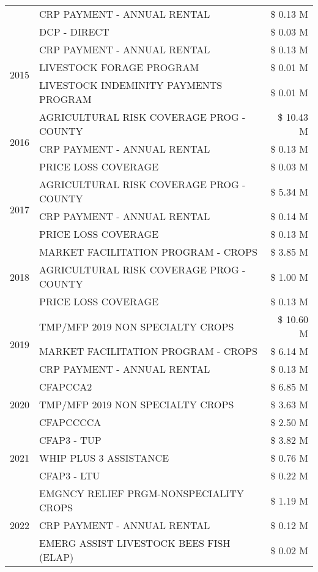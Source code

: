 \begin{tabular}{llr}
 & CRP PAYMENT - ANNUAL RENTAL & \$ 0.13 M \\
 & DCP - DIRECT & \$ 0.03 M \\
\cline{1-3}
\multirow[t]{3}{*}{2015} & CRP PAYMENT - ANNUAL RENTAL & \$ 0.13 M \\
 & LIVESTOCK FORAGE PROGRAM & \$ 0.01 M \\
 & LIVESTOCK INDEMINITY PAYMENTS PROGRAM & \$ 0.01 M \\
\cline{1-3}
\multirow[t]{3}{*}{2016} & AGRICULTURAL RISK COVERAGE PROG - COUNTY & \$ 10.43 M \\
 & CRP PAYMENT - ANNUAL RENTAL & \$ 0.13 M \\
 & PRICE LOSS COVERAGE & \$ 0.03 M \\
\cline{1-3}
\multirow[t]{3}{*}{2017} & AGRICULTURAL RISK COVERAGE PROG - COUNTY & \$ 5.34 M \\
 & CRP PAYMENT - ANNUAL RENTAL & \$ 0.14 M \\
 & PRICE LOSS COVERAGE & \$ 0.13 M \\
\cline{1-3}
\multirow[t]{3}{*}{2018} & MARKET FACILITATION PROGRAM - CROPS & \$ 3.85 M \\
 & AGRICULTURAL RISK COVERAGE PROG - COUNTY & \$ 1.00 M \\
 & PRICE LOSS COVERAGE & \$ 0.13 M \\
\cline{1-3}
\multirow[t]{3}{*}{2019} & TMP/MFP 2019 NON SPECIALTY CROPS & \$ 10.60 M \\
 & MARKET FACILITATION PROGRAM - CROPS & \$ 6.14 M \\
 & CRP PAYMENT - ANNUAL RENTAL & \$ 0.13 M \\
\cline{1-3}
\multirow[t]{3}{*}{2020} & CFAPCCA2 & \$ 6.85 M \\
 & TMP/MFP 2019 NON SPECIALTY CROPS & \$ 3.63 M \\
 & CFAPCCCCA & \$ 2.50 M \\
\cline{1-3}
\multirow[t]{3}{*}{2021} & CFAP3 - TUP & \$ 3.82 M \\
 & WHIP PLUS 3 ASSISTANCE & \$ 0.76 M \\
 & CFAP3 - LTU & \$ 0.22 M \\
\cline{1-3}
\multirow[t]{3}{*}{2022} & EMGNCY RELIEF PRGM-NONSPECIALITY CROPS & \$ 1.19 M \\
 & CRP PAYMENT - ANNUAL RENTAL & \$ 0.12 M \\
 & EMERG ASSIST LIVESTOCK BEES FISH (ELAP) & \$ 0.02 M \\
\cline{1-3}
\bottomrule
\end{tabular}

